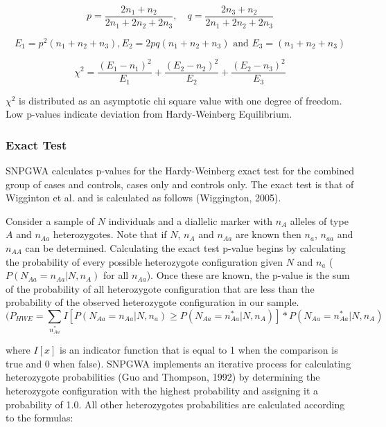 \begin{equation*}
  p = \frac{2n_1 + n_2}{2n_1 + 2n_2 + 2n_3}, \quad  q = \frac{2n_3 +n_2}{2n_1 + 2n_2 + 2n_3}
\end{equation*}

\begin{equation*}
  E_1=p^2(n_1 + n_2 +n_3), E_2 = 2pq(n_1 + n_2 +n_3) \text{ and } E_3=(n_1 + n_2 +n_3)
\end{equation*}

\begin{equation*}
  \chi^2 = \frac{(E_1 - n_1)^2}{E_1} + \frac{(E_2 - n_2)^2}{E_2} + \frac{(E_2 - n_3)^2}{E_3}
\end{equation*}

$\chi^2$ is distributed as an asymptotic chi square value with one degree of
freedom.  Low p-values indicate deviation from Hardy-Weinberg Equilibrium.

\subsubsection{Exact Test}
\label{exact-test}
SNPGWA calculates p-values for the Hardy-Weinberg exact test for the combined
group of cases and controls, cases only and controls only.  The exact test is
that of Wigginton et al. and is calculated as follows (Wiggington, 2005).

Consider a sample of $N$ individuals and a diallelic marker with $n_A$ alleles of
type $A$ and $n_{Aa}$ heterozygotes.  Note that if $N$, $n_A$ and $n_{Aa}$ are
known then $n_a$, $n_{aa}$ and $n_{AA}$ can be determined.  Calculating the
exact test p-value begins by calculating the probability of every possible
heterozygote configuration given $N$ and $n_a$ ($P(N_{Aa} = n_{Aa} |N,n_A)$ for
all $n_{Aa}$). Once these are known, the p-value is the sum of the probability
of all heterozygote configuration that are less than the probability of the
observed heterozygote configuration in our sample.
\begin{equation*}
(P_{HWE}=\sum_{n^*_{Aa}}I[P(N_{Aa} = n_{Aa}|N,n_a)\geq P(N_{Aa} = n^*_{Aa}|N,n_A)] * P(N_{Aa} = n^*_{Aa}|N,n_A)
\end{equation*}

\vspace{1em}
where $I[x]$ is an indicator function that is equal to 1 when the
comparison is true and 0 when false).  SNPGWA implements an iterative process
for calculating heterozygote probabilities (Guo and Thompson, 1992) by
determining the heterozygote configuration with the highest probability and
assigning it a probability of 1.0.  All other heterozygotes probabilities are
calculated according to the formulas:
\vspace{1em}

